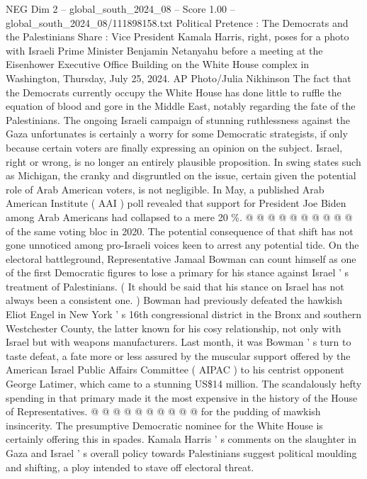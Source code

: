 \begin{textsample}{NEG Dim 2 – global\_south\_2024\_08 – Score 1.00 – global\_south\_2024\_08/111898158.txt}  \label{ex:f2_neg_432}
Political Pretence : The Democrats and the Palestinians Share : Vice President Kamala Harris, right, poses for a photo with Israeli Prime Minister Benjamin Netanyahu before a meeting at the Eisenhower Executive Office Building on the White House complex in Washington, Thursday, July 25, 2024.
AP Photo/Julia Nikhinson The fact that the Democrats currently occupy the White House has done little to ruffle the equation of blood and gore in the Middle East, notably regarding the fate of the Palestinians.
The ongoing Israeli campaign of stunning ruthlessness against the Gaza unfortunates is certainly a worry for some Democratic strategists, if only because certain voters are finally expressing an opinion on the subject.
Israel, right or wrong, is no longer an entirely plausible proposition.
In swing states such as Michigan, the cranky and disgruntled on the issue, certain given the potential role of Arab American voters, is not negligible.
In May, a published Arab American Institute ( AAI ) poll revealed that support for President Joe Biden among Arab Americans had collapsed to a mere 20 \%. @ @ @ @ @ @ @ @ @ @ of the same voting bloc in 2020.
The potential consequence of that shift has not gone unnoticed among pro-Israeli voices keen to arrest any potential tide.
On the electoral battleground, Representative Jamaal Bowman can count himself as one of the first Democratic figures to lose a primary for his stance against Israel ' s treatment of Palestinians. ( It should be said that his stance on Israel has not always been a consistent one. ) Bowman had previously defeated the hawkish Eliot Engel in New York ' s 16th congressional district in the Bronx and southern Westchester County, the latter known for his cosy relationship, not only with Israel but with weapons manufacturers.
Last month, it was Bowman ' s turn to taste defeat, a fate more or less assured by the muscular support offered by the American Israel Public Affairs Committee ( AIPAC ) to his centrist opponent George Latimer, which came to a stunning US\$14 million.
The scandalously hefty spending in that primary made it the most expensive in the history of the House of Representatives. @ @ @ @ @ @ @ @ @ @ for the pudding of mawkish insincerity.
The presumptive Democratic nominee for the White House is certainly offering this in spades.
Kamala Harris ' s comments on the slaughter in Gaza and Israel ' s overall policy towards Palestinians suggest political moulding and shifting, a ploy intended to stave off electoral threat.

\end{textsample}
